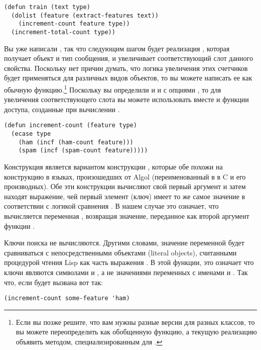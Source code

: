 \begin{lstlisting}
(defun train (text type)
  (dolist (feature (extract-features text))
    (increment-count feature type))
  (increment-total-count type))
\end{lstlisting}

Вы уже написали , так что следующим шагом будет реализация
, которая получает объект  и тип сообщения, и
увеличивает соответствующий слот данного свойства.  Поскольку нет причин думать, что
логика увеличения этих счетчиков будет применяться для различных видов объектов, то вы
можете написать ее как обычную функцию.\footnote{Если вы позже решите, что вам нужны
  разные версии  для разных классов, то вы можете переопределить
   как обобщенную функцию, а текущую реализацию объявить методом,
  специализированным для .}  Поскольку вы определили и 
и  с опциями , то для увеличения соответствующего слота
вы можете использовать вместе  и функции доступа, созданные при вычислении
.

\begin{lstlisting}
(defun increment-count (feature type)
  (ecase type
    (ham (incf (ham-count feature)))
    (spam (incf (spam-count feature)))))
\end{lstlisting}

Конструкция  является вариантом конструкции , которые обе похожи на
конструкцию  в языках, произошедших от Algol (переименованный в  в
C и его производных).  Обе эти конструкции вычисляют свой первый аргумент и затем находят
выражение, чей первый элемент (ключ) имеет то же самое значение в соответствии с логикой
сравнения .  В нашем случае это означает, что вычисляется переменная
, возвращая значение, переданное как второй аргумент функции
.

Ключи поиска не вычисляются.  Другими словами, значение переменной  будет
сравниваться с непосредственными объектами (literal objects), считанными процедурой чтения
Lisp как часть выражения . В этой функции, это означает что ключи являются
символами  и , а не значениями переменных с именами  и
.  Так что, если  будет вызвана вот так:

\begin{lstlisting}
(increment-count some-feature 'ham)
\end{lstlisting}

